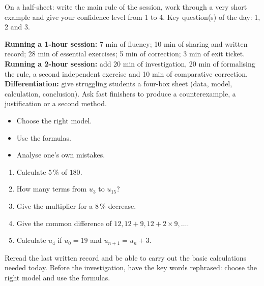 \begin{sortie}On a half-sheet: write the main rule of the session, work through a very short example and give your confidence level from 1 to 4. Key question(s) of the day: 1, 2 and 3.\end{sortie}

\ifprof
\begin{methode}
\textbf{Running a 1-hour session:} 7 min of fluency; 10 min of sharing and written record; 28 min of essential exercises; 5 min of correction; 3 min of exit ticket.\\
\textbf{Running a 2-hour session:} add 20 min of investigation, 20 min of formalising the rule, a second independent exercise and 10 min of comparative correction.\\
\textbf{Differentiation:} give struggling students a four-box sheet (data, model, calculation, conclusion). Ask fast finishers to produce a counterexample, a justification or a second method.
\end{methode}
\fi
{}
\begin{objectifs}\begin{itemize}\item Choose the right model.\item Use the formulas.\item Analyse one's own mistakes.\end{itemize}\end{objectifs}
\begin{automatismes}\begin{enumerate}\item Calculate $5\,\%$ of $180$. \item How many terms from $u_3$ to $u_{15}$? \item Give the multiplier for a $8\,\%$ decrease. \item Give the common difference of $12,12+9,12+2\times9,\ldots$. \item Calculate $u_4$ if $u_0=19$ and $u_{n+1}=u_n+3$. \end{enumerate}\end{automatismes}
\begin{prerequis}Reread the last written record and be able to carry out the basic calculations needed today. Before the investigation, have the key words rephrased: choose the right model and use the formulas.\end{prerequis}

